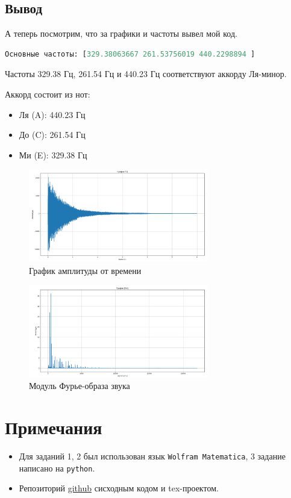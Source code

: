 \documentclass[a4paper,12pt]{article}
\begin{document}
\subsection{Вывод}
А теперь посмотрим, что за графики и частоты вывел мой код.
\begin{lstlisting}[language=Python, caption=Вывод основных частот аккорды]
Основные частоты: [329.38063667 261.53756019 440.2298894 ]
\end{lstlisting}

Частоты 329.38 Гц, 261.54 Гц и 440.23 Гц соответствуют аккорду Ля-минор.

Аккорд состоит из нот:
\begin{itemize}
    \item Ля (A): 440.23 Гц
    \item До (C): 261.54 Гц
    \item Ми (E): 329.38 Гц
\end{itemize}










\begin{figure}[h!]
    \centering
    \includegraphics[width=0.7\textwidth]{images/f(t).png}
    \caption{График амплитуды от времени} %
    \label{fig:ReIm}
\end{figure}

\begin{figure}[h!]
    \centering
    \includegraphics[width=0.7\textwidth]{images/f(v).png}
    \caption{Модуль Фурье-образа звука} %
    \label{fig:Abs}
\end{figure}






\newpage
\section{Примечания}

\begin{itemize}
    \item Для заданий 1, 2 был использован язык \texttt{Wolfram Matematica}, 3 задание написано на \texttt{python}.
    \item Репозиторий \href{https://github.com/decadeos/frequency-methods}{github} сисходным кодом и tex-проектом.
\end{itemize}
\end{document}
